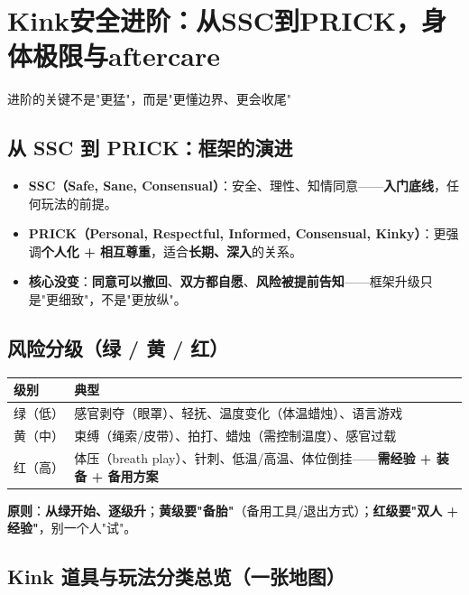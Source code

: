 \documentclass[12pt,UTF8,openany]{ctexbook}
\begin{document}
\chapter{Kink安全进阶：从SSC到PRICK，身体极限与aftercare}

\begin{center}
\myhei\large 进阶的关键不是"更猛"，而是"更懂边界、更会收尾"
\end{center}

\section{从 SSC 到 PRICK：框架的演进}
\begin{itemize}[leftmargin=2em,itemsep=0.3em]
  \item \textbf{SSC（Safe, Sane, Consensual）}：安全、理性、知情同意——\textbf{入门底线}，任何玩法的前提。
  \item \textbf{PRICK（Personal, Respectful, Informed, Consensual, Kinky）}：更强调\textbf{个人化 + 相互尊重}，适合\textbf{长期、深入}的关系。
  \item \textbf{核心没变}：\textbf{同意可以撤回}、\textbf{双方都自愿}、\textbf{风险被提前告知}——框架升级只是"更细致"，不是"更放纵"。
\end{itemize}

\section{风险分级（绿 / 黄 / 红）}
\begin{tabularx}{\textwidth}{X X}
\toprule
\textbf{级别} & \textbf{典型} \\
\midrule
绿（低） & 感官剥夺（眼罩）、轻抚、温度变化（体温蜡烛）、语言游戏 \\
黄（中） & 束缚（绳索/皮带）、拍打、蜡烛（需控制温度）、感官过载 \\
红（高） & 体压（breath play）、针刺、低温/高温、体位倒挂——\textbf{需经验 + 装备 + 备用方案} \\
\bottomrule
\end{tabularx}
\par\smallskip
\textbf{原则}：\textbf{从绿开始、逐级升}；\textbf{黄级要"备胎"}（备用工具/退出方式）；\textbf{红级要"双人 + 经验"}，别一个人"试"。

\section{Kink 道具与玩法分类总览（一张地图）}
\end{document}
